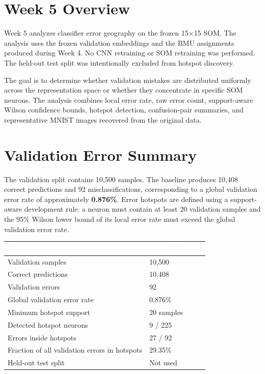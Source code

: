 \documentclass[11pt]{article}
\begin{document}
\setcounter{page}{2}

\section{Week 5 Overview}
Week 5 analyzes classifier error geography on the frozen 15$\times$15 SOM. The analysis uses the frozen validation embeddings and the BMU assignments produced during Week 4. No CNN retraining or SOM retraining was performed. The held-out test split was intentionally excluded from hotspot discovery.

The goal is to determine whether validation mistakes are distributed uniformly across the representation space or whether they concentrate in specific SOM neurons. The analysis combines local error rate, raw error count, support-aware Wilson confidence bounds, hotspot detection, confusion-pair summaries, and representative MNIST images recovered from the original data.

\section{Validation Error Summary}
The validation split contains 10,500 samples. The baseline produces 10,408 correct predictions and 92 misclassifications, corresponding to a global validation error rate of approximately \textbf{0.876\%}. Error hotspots are defined using a support-aware development rule: a neuron must contain at least 20 validation samples and the 95\% Wilson lower bound of its local error rate must exceed the global validation error rate.

\begin{table}[H]
\centering
\begin{tabular}{|p{}|p{}|}
\hline
\rowcolor{TableHeader}
\textcolor{white}{\textbf{Metric}} & \textcolor{white}{\textbf{Week 5 Result}} \\
\hline
Validation samples & 10,500 \\
\hline
Correct predictions & 10,408 \\
\hline
Validation errors & 92 \\
\hline
Global validation error rate & 0.876\% \\
\hline
Minimum hotspot support & 20 samples \\
\hline
Detected hotspot neurons & 9 / 225 \\
\hline
Errors inside hotspots & 27 / 92 \\
\hline
Fraction of all validation errors in hotspots & 29.35\% \\
\hline
Held-out test split & Not used \\
\hline
\end{tabular}
\end{table}
\end{document}
